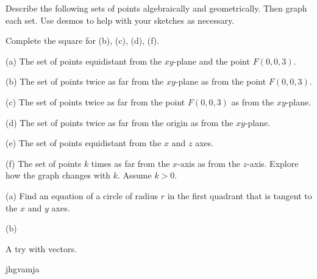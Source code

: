 \documentclass{ximera}
\begin{document}
\begin{question} \label{Q2:Coordinates}
Describe the following sets of points algebraically and geometrically. Then graph each set. Use desmos to help with your sketches as necessary.

Complete the square for (b), (c), (d), (f).

(a) The set of points equidistant from the $xy$-plane and the point $F(0,0,3)$.

(b) The set of points twice as far from the $xy$-plane as from the point $F(0,0,3)$.

(c) The set of points twice as far from the point $F(0,0,3)$ as from the $xy$-plane.


(d) The set of points twice as far from the origin as from the $xy$-plane.

(e) The set of points equidistant from the $x$ and $z$ axes.

(f) The set of points $k$ times as far from the $x$-axis as from the $z$-axis. Explore how the graph changes with $k$. Assume $k>0$.

\end{question}


\begin{question} \label{Q3:Coordinates}
(a) Find an equation of a circle of radius $r$ in the first quadrant that is tangent to the $x$ and $y$ axes.

(b) 
\end{question}





 
\begin{onlineOnly}
    \begin{center}
\end{center}
\end{onlineOnly}




 
\begin{onlineOnly}
    \begin{center}
\end{center}
\end{onlineOnly}


A try with vectors.

 
\begin{onlineOnly}
    \begin{center}
\end{center}
\end{onlineOnly}

jhgvamja
\end{document}

